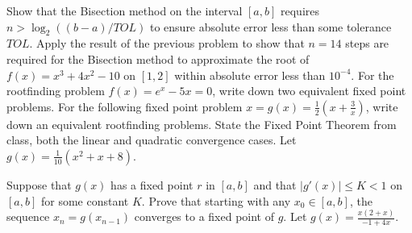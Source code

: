 \documentclass[addpoints, 11pt]{exam}
\begin{document}
\begin{questions}
\question Show that the Bisection method on the interval $[a,b]$ requires $n>\log_2((b-a)/TOL)$ to ensure absolute error less than some tolerance $TOL$. 
\question Apply the result of the previous problem to show that $n=14$ steps are required for the Bisection method to approximate the root of $f(x)=x^3+4x^2-10$ on $[1,2]$ within absolute error less than $10^{-4}$.
\question For the rootfinding problem $f(x)=e^x-5x=0$, write down two equivalent fixed point problems.
\question For the following fixed point problem $x=g(x)=\frac{1}{2}\left(x+\frac{3}{x}\right)$, write down an equivalent rootfinding problems.
\question State the Fixed Point Theorem from class, both the linear and quadratic convergence cases.
\question Let $g(x)=\frac{1}{10}(x^2+x+8)$.
\question Suppose that $g(x)$ has a fixed point $r$ in $[a,b]$ and that $|g'(x)|\leq K<1$ on $[a,b]$ for some constant $K$. Prove that starting with any $x_0 \in [a,b]$, the sequence $x_n=g(x_{n-1})$ converges to a fixed point of $g$. 
\question Let $g(x)=\frac{x(2+x)}{-1+4x}$.
\end{questions}
\end{document}
